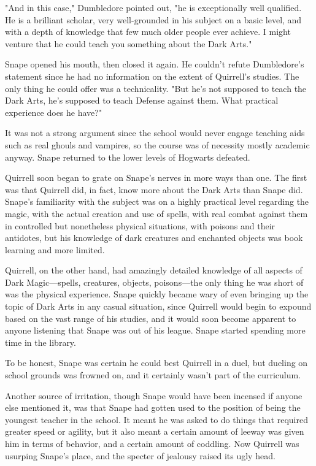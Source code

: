 "And in this case," Dumbledore pointed out, "he is exceptionally well qualified. He is a brilliant scholar, very well-grounded in his subject on a basic level, and with a depth of knowledge that few much older people ever achieve. I might venture that he could teach you something about the Dark Arts."

Snape opened his mouth, then closed it again. He couldn't refute Dumbledore's statement since he had no information on the extent of Quirrell's studies. The only thing he could offer was a technicality. "But he's not supposed to teach the Dark Arts, he's supposed to teach Defense against them. What practical experience does he have?"

It was not a strong argument since the school would never engage teaching aids such as real ghouls and vampires, so the course was of necessity mostly academic anyway. Snape returned to the lower levels of Hogwarts defeated.

Quirrell soon began to grate on Snape's nerves in more ways than one. The first was that Quirrell did, in fact, know more about the Dark Arts than Snape did. Snape's familiarity with the subject was on a highly practical level regarding the magic, with the actual creation and use of spells, with real combat against them in controlled but nonetheless physical situations, with poisons and their antidotes, but his knowledge of dark creatures and enchanted objects was book learning and more limited.

Quirrell, on the other hand, had amazingly detailed knowledge of all aspects of Dark Magic—spells, creatures, objects, poisons—the only thing he was short of was the physical experience. Snape quickly became wary of even bringing up the topic of Dark Arts in any casual situation, since Quirrell would begin to expound based on the vast range of his studies, and it would soon become apparent to anyone listening that Snape was out of his league. Snape started spending more time in the library.

To be honest, Snape was certain he could best Quirrell in a duel, but dueling on school grounds was frowned on, and it certainly wasn't part of the curriculum.

Another source of irritation, though Snape would have been incensed if anyone else mentioned it, was that Snape had gotten used to the position of being the youngest teacher in the school. It meant he was asked to do things that required greater speed or agility, but it also meant a certain amount of leeway was given him in terms of behavior, and a certain amount of coddling. Now Quirrell was usurping Snape's place, and the specter of jealousy raised its ugly head.

